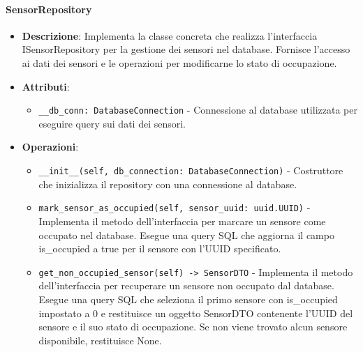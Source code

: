 \documentclass[10pt]{article}
\begin{document}
    \paragraph{SensorRepository}
    \begin{itemize} 
    \item \textbf{Descrizione}: Implementa la classe concreta che realizza l'interfaccia ISensorRepository per la gestione dei sensori nel database. Fornisce l'accesso ai dati dei sensori e le operazioni per modificarne lo stato di occupazione.
    \item \textbf{Attributi}:
    \begin{itemize}
        \item \texttt{\_\_db\_conn: DatabaseConnection} - Connessione al database utilizzata per eseguire query sui dati dei sensori.
    \end{itemize}
    
    \item \textbf{Operazioni}:
    \begin{itemize}
        \item \texttt{\_\_init\_\_(self, db\_connection: DatabaseConnection)} - Costruttore che inizializza il repository con una connessione al database.
        
        \item \texttt{mark\_sensor\_as\_occupied(self, sensor\_uuid: uuid.UUID)} - Implementa il metodo dell'interfaccia per marcare un sensore come occupato nel database. Esegue una query SQL che aggiorna il campo is\_occupied a true per il sensore con l'UUID specificato.
        
        \item \texttt{get\_non\_occupied\_sensor(self) -> SensorDTO} - Implementa il metodo dell'interfaccia per recuperare un sensore non occupato dal database. Esegue una query SQL che seleziona il primo sensore con is\_occupied impostato a 0 e restituisce un oggetto SensorDTO contenente l'UUID del sensore e il suo stato di occupazione. Se non viene trovato alcun sensore disponibile, restituisce None.
    \end{itemize}
    \end{itemize}
\end{document}
